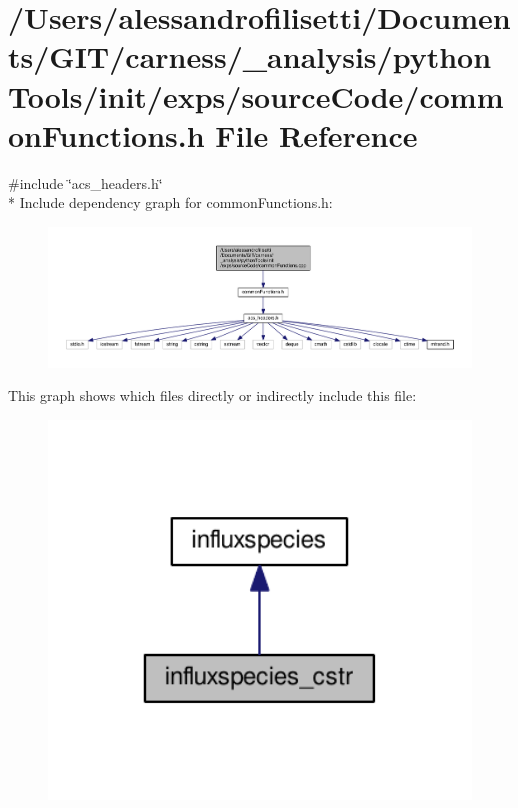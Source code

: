 \hypertarget{a00058}{\section{/\-Users/alessandrofilisetti/\-Documents/\-G\-I\-T/carness/\-\_\-analysis/python\-Tools/init/exps/source\-Code/common\-Functions.h File Reference}
\label{a00058}
}
{\ttfamily \#include \char`\"{}acs\-\_\-headers.\-h\char`\"{}}\\*
Include dependency graph for common\-Functions.\-h\-:
\nopagebreak
\begin{figure}[H]
\begin{center}
\leavevmode
\includegraphics[width=350pt]{a00172}
\end{center}
\end{figure}
This graph shows which files directly or indirectly include this file\-:
\nopagebreak
\begin{figure}[H]
\begin{center}
\leavevmode
\includegraphics[width=350pt]{a00173}
\end{center}
\end{figure}
